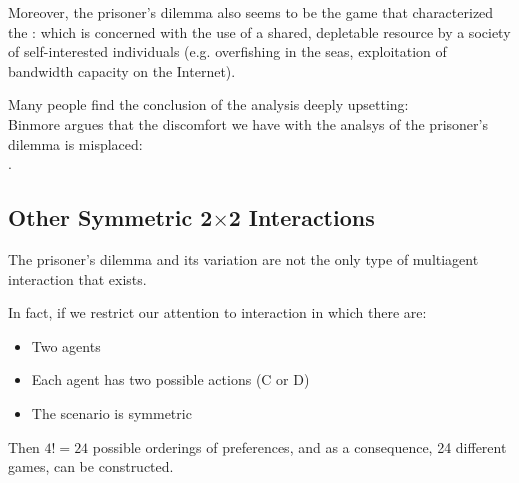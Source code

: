	 \cite{mastxt}
	
	Moreover, the prisoner’s dilemma also seems to be the game that characterized the : which is concerned with the use of a shared, depletable resource by a society of self-interested individuals (e.g. overfishing in the seas, exploitation of bandwidth capacity on the Internet).
	
	Many people find the conclusion of the analysis deeply upsetting: \cite{mastxt}\\
	Binmore argues that the discomfort we have with the analsys of the prisoner’s dilemma is misplaced:\\
	.
	
\subsection{Other Symmetric 2$\times$2 Interactions}
The prisoner’s dilemma and its variation are not the only type of multiagent interaction that exists.
	
	In fact, if we restrict our attention to interaction in which there are:
	\begin{itemize}
	\item Two agents
	\item Each agent has two possible actions (C or D)
	\item The scenario is symmetric
	\end{itemize}
	Then $4! = 24$ possible orderings of preferences, and as a consequence, 24 different games, can be constructed.
	

